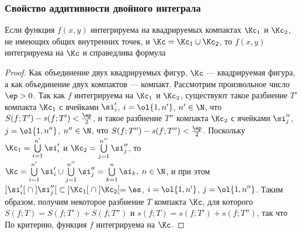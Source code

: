 \documentclass[a4paper]{article}
\begin{document}
\subsubsection{Свойство аддитивности двойного интеграла}

\begin{theorem}
\label{thm451} Если функция $f(x,y)$ интегрируема на квадрируемых
компактах $\Kc_1$ и $\Kc_2$, не имеющих общих внутренних точек, и
$\Kc=\Kc_1\cup\Kc_2$, то $f(x,y)$ интегрируема на $\Kc$ и
справедлива формула 
\end{theorem}

\begin{proof}
Как объединение двух квадрируемых фигур, $\Kc$ --- квадрируемая
фигура, а как объединение двух компактов --- компакт. Рассмотрим
произвольное число $\ep>0$. Так как $f$ интегрируема на $\Kc_1$ и
$\Kc_2$, существуют такое разбиение $T'$ компакта $\Kc_1$ с ячейками
$\si'_i$, $i=\ol{1,n'}$, $n'\in\N$, что
$S(f;T')-s(f;T')<\frac{\ep}2$, и такое разбиение $T''$ компакта
$\Kc_2$ с ячейками $\si_j''$, $j=\ol{1,n''}$, $n''\in\N$, что
$S(f;T'')-s(f;T'')<\frac{\ep}2$. Поскольку
$\Kc_1=\bigcup\limits_{i=1}^{n'} \si_i'$ и $\Kc_2 =
\bigcup\limits_{j=1}^{n''} \si_j''$, то $\Kc =
\bigcup\limits_{i=1}^{n'}\si_i'\cup\bigcup\limits_{j=1}^{n''}
\si_j'' = \bigcup\limits_{k=1}^n\si_k, \; n\in\N$, и при этом
$]\si'_i[ \; \cap \; ]\si''_j[ \; \subset \; ]\Kc_1[ \; \cap \;
]\Kc_2[ = \es$, $i=\ol{1,n'}$, $j=\ol{1,n''}$. Таким образом,
получим некоторое разбиение $T$ компакта $\Kc$, для которого
$S(f;T)=S(f;T')+S(f;T'')$ и $s(f;T)=s(f;T')+s(f;T'')$, так что
 По критерию, функция $f$ интегрируема
на $\Kc$.


\end{proof}
\end{document}
